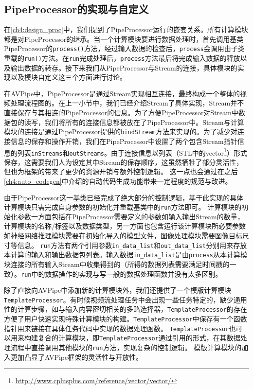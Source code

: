 \subsection{PipeProcessor的实现与自定义}
在\ref{ch4:design_proc}中，我们提到了PipeProcessor运行的嵌套关系。所有计算模块都是对PipeProcessor的继承。当一个计算模块要进行数据处理时，首先调用基类PipeProcessor的\texttt{process()}方法，经过输入数据的检查后，\texttt{process}会调用由子类重载的\texttt{run()}方法。在\texttt{run}完成处理后，\texttt{process}方法最后将完成输入数据的释放以及输出数据的转存。接下来我们从PipeProcessor与Stream的连接，具体模块的实现以及模块自定义这三个方面进行讨论。\par
在AVPipe中，PipeProcessor是通过Stream实现相互连接，最终构成一个整体的视频处理流程图的。在上一小节中，我们已经介绍Stream了具体实现，Stream并不直接保存与其相连的PipeProcessor的信息。为了方便PipeProcessor对Stream中数据包的读写，我们将所有的连接信息都被放在了PipeProcessor中。Stream与计算模块的连接是通过PipeProcessor提供的\texttt{bindStream}方法来实现的。为了减少对连接信息的保存和操作开销，我们在PipeProcessor中设置了两个包含Stream指针信息的列表\texttt{inStreams}和\texttt{outStreams}。由于连接信息以列表（STL中的vector\footnote{\url{http://www.cplusplus.com/reference/vector/vector/}}）形式保存，这需要我们人为设定其中Stream的保存顺序，这虽然牺牲了部分灵活性，但也为框架的带来了更少的资源开销与额外控制逻辑。
这一点也会通过在之后\ref{ch4:auto_codegen}中介绍的自动代码生成功能带来一定程度的规范与改进。
\par
由于PipeProcessor这一基类已经完成了绝大部分的控制逻辑，基于此实现的具体计算模块只需完成自身参数的初始化并重载基类中的\texttt{run}方法即可。
计算模块的初始化参数一方面包括在PipeProcessor需要定义的参数如输入输出Stream的数量，计算模块的名称/标签以及数据类型，另一方面也包含运行该计算模块所必要参数如神经网络推理模块需要在初始化导入的模型文件，图像处理模块需要图像目标尺寸等信息。
\texttt{run}方法有两个引用参数\texttt{in\_data\_list}和\texttt{out\_data\_list}分别用来存放本计算的输入和输出数据包列表。输入数据\texttt{in\_data\_list}是由\texttt{process}从本计算模块连接的所有输入Stream中收集得到的（所得的数据列表需要满足时间戳的一致）。\texttt{run}中的数据操作的实现与写一般的数据处理函数并没有太多区别。\par
除了直接向AVPipe中添加新的计算模块外，我们还提供了一个模版计算模块\texttt{TemplateProcessor}。有时候视频流处理任务中会出现一些任务特定的，缺少通用性的计算步骤，如与输入内容密切相关的多路选择器，\texttt{TemplateProcessor}的存在方便了用户快速实现特殊计算模块的构建。\texttt{TemplateProcessor}中保存有一个函数指针用来链接在具体任务代码中实现的数据处理函数。
\texttt{TemplateProcessor}也可以用来构建复合的计算模块，即\texttt{TemplateProcessor}通过引用的形式，在其数据处理流程中直接调用其他模块的\texttt{run}方法，实现复杂的控制逻辑。
模版计算模块的加入更加凸显了AVPipe框架的灵活性与开放性。

